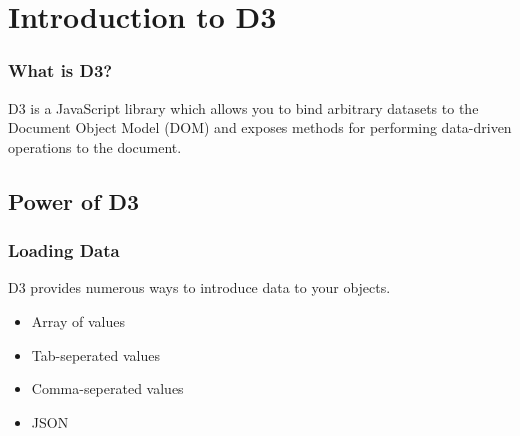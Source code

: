 \documentclass[red]{beamer}
\begin{document}


\begin{frame}
  \titlepage
\end{frame}

\section[Outline]{}

\section{Introduction to D3}

\begin{frame}
    \frametitle{What is D3?}
    D3 is a JavaScript library which allows you to bind arbitrary datasets to 
    the Document Object Model (DOM) and exposes methods for performing data-driven operations to the document.  
\end{frame}


\subsection{Power of D3}

\begin{frame}
  \frametitle{Loading Data}   %
  D3 provides numerous ways to introduce data to your objects. 
  \begin{itemize}
  \item<1-> Array of values
  \item<2-> Tab-seperated values
  \item<3-> Comma-seperated values
  \item<4-> JSON
  \end{itemize}
\end{frame}
\end{document}
